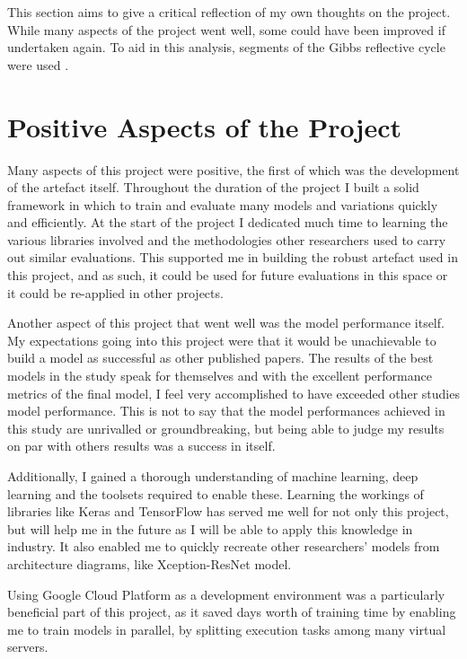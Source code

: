 This section aims to give a critical reflection of my own thoughts on the project. While many aspects of the project went well, some could have been improved if undertaken again. To aid in this analysis, segments of the Gibbs reflective cycle were used \citep{gibbs1988learning}.

\section{Positive Aspects of the Project}
Many aspects of this project were positive, the first of which was the development of the artefact itself. Throughout the duration of the project I built a solid framework in which to train and evaluate many models and variations quickly and efficiently. At the start of the project I dedicated much time to learning the various libraries involved and the methodologies other researchers used to carry out similar evaluations.  This supported me in building the robust artefact used in this project, and as such, it could be used for future evaluations in this space or it could be re-applied in other projects.

Another aspect of this project that went well was the model performance itself. My expectations going into this project were that it would be unachievable to build a model as successful as other published papers. The results of the best models in the study speak for themselves and with the excellent performance metrics of the final model, I feel very accomplished to have exceeded other studies model performance. This is not to say that the model performances achieved in this study are unrivalled or groundbreaking, but being able to judge my results on par with others results was a success in itself.

Additionally, I gained a thorough understanding of machine learning, deep learning and the toolsets required to enable these. Learning the workings of libraries like Keras and TensorFlow has served me well for not only this project, but will help me in the future as I will be able to apply this knowledge in industry. It also enabled me to quickly recreate other researchers' models from architecture diagrams, like \cite{fitriasari2021improvement} Xception-ResNet model. 

Using Google Cloud Platform as a development environment was a particularly beneficial part of this project, as it saved days worth of training time by enabling me to train models in parallel, by splitting execution tasks among many virtual servers.

